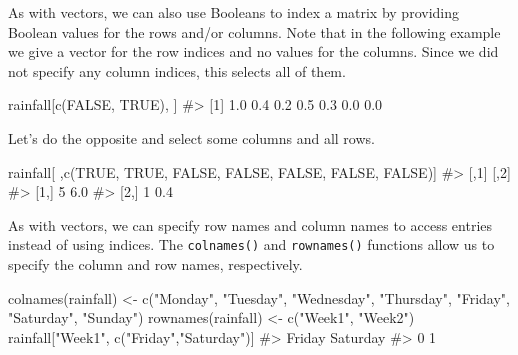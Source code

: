 \documentclass[
  letterpaper,
]{latex/krantz}
\makeatletter
\newenvironment{Shaded}{\begin{snugshade}}{\end{snugshade}}
\newcommand{\CommentTok}[1]{\textcolor[rgb]{0.37,0.37,0.37}{#1}}
\newcommand{\ConstantTok}[1]{\textcolor[rgb]{0.56,0.35,0.01}{#1}}
\newcommand{\FunctionTok}[1]{\textcolor[rgb]{0.28,0.35,0.67}{#1}}
\newcommand{\NormalTok}[1]{\textcolor[rgb]{0.00,0.23,0.31}{#1}}
\newcommand{\OtherTok}[1]{\textcolor[rgb]{0.00,0.23,0.31}{#1}}
\newcommand{\StringTok}[1]{\textcolor[rgb]{0.13,0.47,0.30}{#1}}
\newenvironment{kframe}{%
\medskip{}
\setlength{\fboxsep}{.8em}
 \def\at@end@of@kframe{}%
 \ifinner\ifhmode%
  \def\at@end@of@kframe{\end{minipage}}%
  \begin{minipage}{\columnwidth}%
 \fi\fi%
 \def\FrameCommand##1{\hskip\@totalleftmargin \hskip-\fboxsep
 \colorbox{shadecolor}{##1}\hskip-\fboxsep
     \hskip-\linewidth \hskip-\@totalleftmargin \hskip\columnwidth}%
 \MakeFramed {\advance\hsize-\width
   \@totalleftmargin\z@ \linewidth\hsize
   \@setminipage}}%
 {\par\unskip\endMakeFramed%
 \at@end@of@kframe}
\renewenvironment{Shaded}{\begin{kframe}}{\end{kframe}}
\makeatother
\begin{document}
As with vectors, we can also use Booleans to index a matrix by providing
Boolean values for the rows and/or columns. Note that in the following
example we give a vector for the row indices and no values for the
columns. Since we did not specify any column indices, this selects all
of them.

\begin{Shaded}
\begin{Highlighting}[]
\NormalTok{rainfall[}\FunctionTok{c}\NormalTok{(}\ConstantTok{FALSE}\NormalTok{, }\ConstantTok{TRUE}\NormalTok{), ]}
\CommentTok{\#\textgreater{} [1] 1.0 0.4 0.2 0.5 0.3 0.0 0.0}
\end{Highlighting}
\end{Shaded}

Let's do the opposite and select some columns and all rows.

\begin{Shaded}
\begin{Highlighting}[]
\NormalTok{rainfall[ ,}\FunctionTok{c}\NormalTok{(}\ConstantTok{TRUE}\NormalTok{, }\ConstantTok{TRUE}\NormalTok{, }\ConstantTok{FALSE}\NormalTok{, }\ConstantTok{FALSE}\NormalTok{, }\ConstantTok{FALSE}\NormalTok{, }\ConstantTok{FALSE}\NormalTok{, }\ConstantTok{FALSE}\NormalTok{)]}
\CommentTok{\#\textgreater{}      [,1] [,2]}
\CommentTok{\#\textgreater{} [1,]    5  6.0}
\CommentTok{\#\textgreater{} [2,]    1  0.4}
\end{Highlighting}
\end{Shaded}

As with vectors, we can specify row names and column names
 to access entries instead of using indices. The
\texttt{colnames()}
and \texttt{rownames()}
 functions allow us to
specify the column and row names, respectively.

\begin{Shaded}
\begin{Highlighting}[]
\FunctionTok{colnames}\NormalTok{(rainfall) }\OtherTok{\textless{}{-}} \FunctionTok{c}\NormalTok{(}\StringTok{"Monday"}\NormalTok{, }\StringTok{"Tuesday"}\NormalTok{, }\StringTok{"Wednesday"}\NormalTok{, }\StringTok{"Thursday"}\NormalTok{, }
                        \StringTok{"Friday"}\NormalTok{, }\StringTok{"Saturday"}\NormalTok{, }\StringTok{"Sunday"}\NormalTok{)}
\FunctionTok{rownames}\NormalTok{(rainfall) }\OtherTok{\textless{}{-}} \FunctionTok{c}\NormalTok{(}\StringTok{"Week1"}\NormalTok{, }\StringTok{"Week2"}\NormalTok{)}
\NormalTok{rainfall[}\StringTok{"Week1"}\NormalTok{, }\FunctionTok{c}\NormalTok{(}\StringTok{"Friday"}\NormalTok{,}\StringTok{"Saturday"}\NormalTok{)]}
\CommentTok{\#\textgreater{}   Friday Saturday }
\CommentTok{\#\textgreater{}        0        1}
\end{Highlighting}
\end{Shaded}
\end{document}
